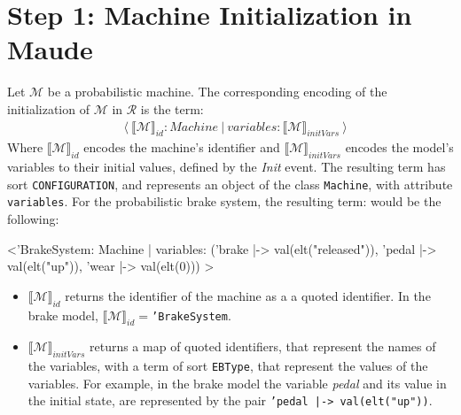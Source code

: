 \section{Step 1: Machine Initialization in Maude}
Let $\mathscr{M}$ be a probabilistic machine. The corresponding encoding of the initialization of $\mathscr{M}$ in $\mathscr{R}$ is the term:
    \begin{align*}
    & \langle \ \llbracket \mathscr{M} \rrbracket_{id} : Machine \ | \ variables: \llbracket \mathscr{M} \rrbracket_{initVars} \ \rangle 
    \end{align*}
Where $\llbracket \mathscr{M} \rrbracket_{id}$ encodes the machine's identifier and $\llbracket \mathscr{M} \rrbracket_{initVars}$ encodes the model's variables to their initial values, defined by the \textit{Init} event. The resulting term has sort \texttt{CONFIGURATION}, and represents an object of the class \texttt{Machine}, with attribute \texttt{variables}. For the probabilistic brake system, the resulting term: would be the following:

\begin{maude}

<'BrakeSystem: Machine | variables: ('brake |-> val(elt("released")), 
                                     'pedal |-> val(elt("up")), 
                                     'wear |-> val(elt(0))) >
\end{maude}

\begin{itemize}
    \item $\llbracket \mathscr{M} \rrbracket_{id}$ returns the identifier of the machine as a a quoted identifier. In the brake model, $\llbracket \mathscr{M} \rrbracket_{id} = $\texttt{'BrakeSystem}.
    \item $\llbracket \mathscr{M} \rrbracket_{initVars}$ returns a map of quoted identifiers, that represent the names of the variables, with a term of sort \texttt{EBType}, that represent the values of the variables. For example, in the brake model the variable \textit{pedal} and its value in the initial state, are represented by the pair \texttt{'pedal |-> val(elt("up"))}.
\end{itemize}

